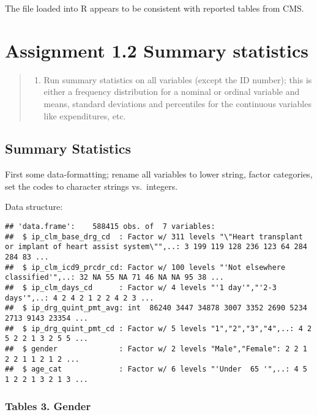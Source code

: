 \documentclass[]{article}
\providecommand{\tightlist}{%
  \setlength{\itemsep}{0pt}\setlength{\parskip}{0pt}}
\begin{document}
The file loaded into R appears to be consistent with reported tables
from CMS.

\hypertarget{assignment-1.2-summary-statistics}{%
\section{Assignment 1.2 Summary
statistics}\label{assignment-1.2-summary-statistics}}

\begin{quote}
\begin{enumerate}
\def\labelenumi{\arabic{enumi}.}
\setcounter{enumi}{1}
\tightlist
\item
  Run summary statistics on all variables (except the ID number); this
  is either a frequency distribution for a nominal or ordinal variable
  and means, standard deviations and percentiles for the continuous
  variables like expenditures, etc.
\end{enumerate}
\end{quote}

\hypertarget{summary-statistics}{%
\subsection{Summary Statistics}\label{summary-statistics}}

First some data-formatting; rename all variables to lower string, factor
categories, set the codes to character strings vs.~integers.

Data structure:

\begin{verbatim}
## 'data.frame':    588415 obs. of  7 variables:
##  $ ip_clm_base_drg_cd  : Factor w/ 311 levels "\"Heart transplant or implant of heart assist system\"",..: 3 199 119 128 236 123 64 284 284 83 ...
##  $ ip_clm_icd9_prcdr_cd: Factor w/ 100 levels "'Not elsewhere classified'",..: 32 NA 55 NA 71 46 NA NA 95 38 ...
##  $ ip_clm_days_cd      : Factor w/ 4 levels "'1 day'","'2-3 days'",..: 4 2 4 2 1 2 2 4 2 3 ...
##  $ ip_drg_quint_pmt_avg: int  86240 3447 34878 3007 3352 2690 5234 2713 9143 23354 ...
##  $ ip_drg_quint_pmt_cd : Factor w/ 5 levels "1","2","3","4",..: 4 2 5 2 2 1 3 2 5 5 ...
##  $ gender              : Factor w/ 2 levels "Male","Female": 2 2 1 2 2 1 1 2 1 2 ...
##  $ age_cat             : Factor w/ 6 levels "'Under  65 '",..: 4 5 1 2 2 1 3 2 1 3 ...
\end{verbatim}

\hypertarget{tables-3.-gender}{%
\subsubsection{Tables 3. Gender}\label{tables-3.-gender}}
\end{document}
